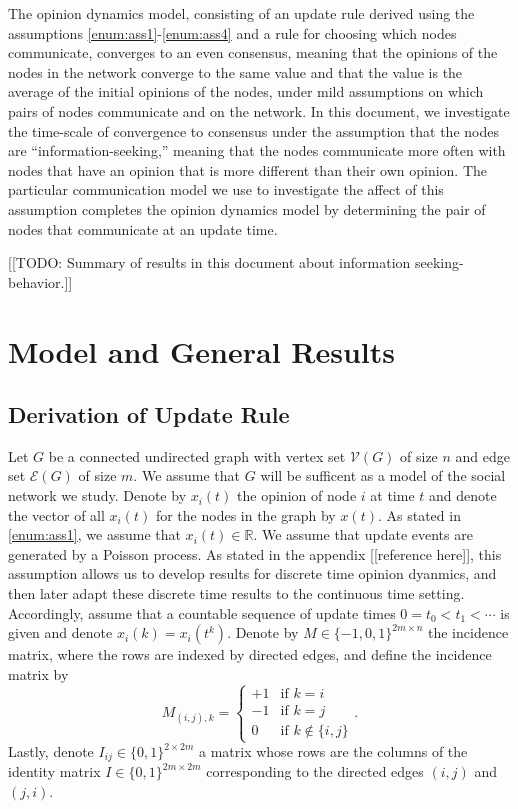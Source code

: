 \documentclass{amsart}
\newcommand{\R}[0]{\mathbb{R}}
\theoremstyle{remark}
\begin{document}
The opinion dynamics model, consisting of an update rule derived using the assumptions \ref{enum:ass1}-\ref{enum:ass4} and a rule for choosing which nodes communicate, converges to an even consensus, meaning that the opinions of the nodes in the network converge to the same value and that the value is the average of the initial opinions of the nodes, under mild assumptions on which pairs of nodes communicate and on the network. In this document, we investigate the time-scale of convergence to consensus under the assumption that the nodes are ``information-seeking,'' meaning that the nodes communicate more often with nodes that have an opinion that is more different than their own opinion. The particular communication model we use to investigate the affect of this assumption completes the opinion dynamics model by determining the pair of nodes that communicate at an update time.

[[TODO: Summary of results in this document about information seeking-behavior.]]

\section{Model and General Results}{\label{sec:modelGenResult}}
\subsection{Derivation of Update Rule}
Let $G$ be a connected undirected graph with vertex set $\mathcal{V}(G)$ of size $n$ and edge set $\mathcal{E}(G)$ of size $m$. We assume that $G$ will be sufficent as a model of the social network we study. Denote by $x_i(t)$ the opinion of node $i$ at time $t$ and denote the vector of all $x_i(t)$ for the nodes in the graph by $x(t)$. As stated in \ref{enum:ass1}, we assume that $x_i(t)\in\R$. We assume that update events are generated by a Poisson process.  As stated in the appendix [[reference here]], this assumption allows us to develop results for discrete time opinion dyanmics, and then later adapt these discrete time results to the continuous time setting. Accordingly, assume that a countable sequence of update times $0=t_0<t_1<\cdots$ is given and denote $x_i(k) = x_i(t^k)$. Denote by $M\in\{-1,0,1\}^{2m\times n}$ the incidence matrix, where the rows are indexed by directed edges, and define the incidence matrix by
\begin{equation}
	M_{(i,j),k} =
	\begin{cases}
		+1 & \text{if } k=i\\
		-1 & \text{if } k=j\\
		0 & \text{if } k\not\in\{i,j\}
	\end{cases}
	.
\end{equation}
Lastly, denote $I_{ij}\in\{0,1\}^{2\times 2m}$ a matrix whose rows are the columns of the identity matrix $I\in\{0,1\}^{2m\times 2m}$ corresponding to the directed edges $(i,j)$ and $(j,i)$. 
\end{document}
